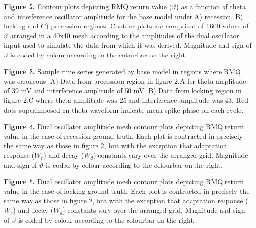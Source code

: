 \documentclass[12pt, letterpaper]{article}
\newenvironment{collapsable}{}{}
\begin{document}
\begin{collapsable}
  \vspace{12pt}

  \begin{center}
  \end{center}
  {\bf Figure 2.} Contour plots depicting RMQ return value ($\vartheta$) as a
  function of theta and interference oscillator amplitude for the base model
  under A) recession, B) locking and C) precession regimes. Contour plots are
  comprised of 1600 values of $\vartheta$ arranged in a 40x40 mesh according to
  the amplitudes of the dual oscillator input used to simulate the data from
  which it was derived. Magnitude and sign of $\vartheta$ is coded by colour
  according to the colourbar on the right.

  \vspace{12pt}

  \begin{center}
  \end{center}
  {\bf Figure 3.} Sample time series generated by base model in regions where
  RMQ was erroneous. A) Data from precession region in figure 2.A for theta
  amplitude of 39 mV and interference amplitude of 50 mV. B) Data from
  locking region in figure 2.C where theta amplitude was 25 and interference
  amplitude was 43. Red dots superimposed on theta waveform indicate
  mean spike phase on each cycle.


  \begin{center}
  \end{center}
  {\bf Figure 4.} Dual oscillator amplitude mesh contour plots depicting RMQ return value in
  the case of recession ground truth. Each plot is contructed in precisely the
  same way as those in figure 2, but with the exception that adaptation response
  ($W_r$) and decay ($W_d$) constants vary over the arranged grid. Magnitude and
  sign of $\vartheta$ is coded by colour according to the colourbar on the right.

  \vspace{12pt}

  \begin{center}
  \end{center}
  {\bf Figure 5.} Dual oscillator amplitude mesh contour plots depicting RMQ return value in
  the case of locking ground truth. Each plot is contructed in precisely the
  same way as those in figure 2, but with the exception that adaptation response
  ($W_r$) and decay ($W_d$) constants vary over the arranged grid. Magnitude and
  sign of $\vartheta$ is coded by colour according to the colourbar on the right.


\end{collapsable}
\end{document}
